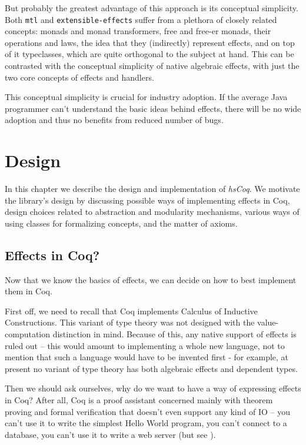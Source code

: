 \documentclass[declaration,inz,english,shortabstract]{iithesis}
\newcommand{\libname}{\textit{hsCoq}}
\newcommand{\m}[1]{\texttt{#1}}
\begin{document}
But probably the greatest advantage of this approach is its conceptual simplicity. Both \m{mtl} and \m{extensible-effects} suffer from a plethora of closely related concepts: monads and monad transformers, free and free-er monads, their operations and laws, the idea that they (indirectly) represent effects, and on top of it typeclasses, which are quite orthogonal to the subject at hand. This can be contrasted with the conceptual simplicity of native algebraic effects, with just the two core concepts of effects and handlers.

This conceptual simplicity is crucial for industry adoption. If the average Java programmer can't understand the basic ideas behind effects, there will be no wide adoption and thus no benefits from reduced number of bugs.

\chapter{Design}

In this chapter we describe the design and implementation of \libname. We motivate the library's design by discussing possible ways of implementing effects in Coq, design choices related to abstraction and modularity mechanisms, various ways of using classes for formalizing concepts, and the matter of axioms.

\section{Effects in Coq?}

Now that we know the basics of effects, we can decide on how to best implement them in Coq.

First off, we need to recall that Coq implements Calculus of Inductive Constructions. This variant of type theory was not designed with the value-computation distinction in mind. Because of this, any native support of effects is ruled out -- this would amount to implementing a whole new language, not to mention that such a language would have to be invented first - for example, at present no variant of type theory has both algebraic effects and dependent types.

Then we should ask ourselves, why do we want to have a way of expressing effects in Coq? After all, Coq is a proof assistant concerned mainly with theorem proving and formal verification that doesn't even support any kind of IO -- you can't use it to write the simplest Hello World program, you can't connect to a database, you can't use it to write a web server (but see \cite{CoqIO}).
\end{document}
